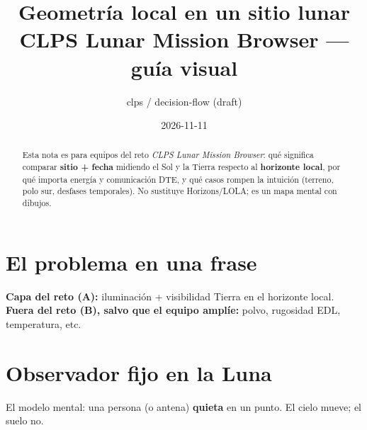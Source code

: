 \documentclass[11pt,a4paper]{article}
\title{Geometría local en un sitio lunar\\{\large CLPS Lunar Mission Browser --- guía visual}}
\author{clps / decision-flow (draft)}
\date{2026-11-11}
\begin{document}
\maketitle

\begin{abstract}
Esta nota es para equipos del reto \emph{CLPS Lunar Mission Browser}: qué significa comparar \textbf{sitio + fecha} midiendo el Sol y la Tierra respecto al \textbf{horizonte local}, por qué importa energía y comunicación DTE, y qué casos rompen la intuición (terreno, polo sur, desfases temporales).
No sustituye Horizons/LOLA; es un mapa mental con dibujos.
\end{abstract}

\tableofcontents
\newpage

\section{El problema en una frase}
\begin{center}
\end{center}

\textbf{Capa del reto (A):} iluminación + visibilidad Tierra en el horizonte local.\\
\textbf{Fuera del reto (B), salvo que el equipo amplíe:} polvo, rugosidad EDL, temperatura, etc.

\section{Observador fijo en la Luna}
El modelo mental: una persona (o antena) \textbf{quieta} en un punto. El cielo mueve; el suelo no.
\end{document}

